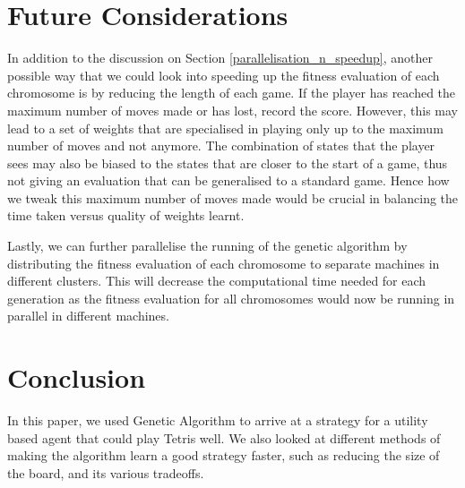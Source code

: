 \documentclass[a4paper,12pt,twocolumn]{article}
\begin{document}
\section{Future Considerations}
\label{future_considerations}
In addition to the discussion on Section \ref{parallelisation_n_speedup},
another possible way that we could look into speeding up the fitness evaluation
of each chromosome is by reducing the length of each game. If the player has reached
the maximum number of moves made or has lost, record the score. However, this may
lead to a set of weights that are specialised in playing only up to the maximum
number of moves and not anymore. The combination of states that the player sees may
also be biased to the states that are closer to the start of a game, thus not
giving an evaluation that can be generalised to a standard game. Hence how we
tweak this maximum number of moves made would be crucial in balancing the
time taken versus quality of weights learnt.

Lastly, we can further parallelise the running of the genetic algorithm by distributing
the fitness evaluation of each chromosome to separate machines in different
clusters. This will decrease the computational time needed for each generation as the
fitness evaluation for all chromosomes would now be running in parallel in different
machines.

\section{Conclusion}
In this paper, we used Genetic Algorithm to arrive at a strategy for a utility based
agent that could play Tetris well. We also looked at different methods of making
the algorithm learn a good strategy faster, such as reducing the size of the board,
and its various tradeoffs.

\end{document}
